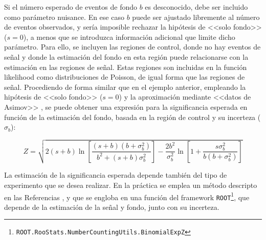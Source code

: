 Si el número esperado de eventos de fondo $b$ es desconocido, debe ser incluido como parámetro nuisance. En ese caso $b$ puede ser ajustado libremente al número de eventos observados, y sería imposible rechazar la hipótesis de <<solo fondo>> ($s=0$), a menos que se introduzca información adicional que limite dicho parámetro. Para ello, se incluyen las regiones de control, donde no hay eventos de señal y donde la estimación del fondo en esta región puede relacionarse con la estimación en las regiones de señal. Estas regiones son incluidas en la función likelihood como distribuciones de Poisson, de igual forma que las regiones de señal. Procediendo de forma similar que en el ejemplo anterior, empleando la hipótesis de <<solo fondo>> ($s=0$) y la aproximación mediante <<datos de Asimov>> \cite{Cowan:2010js}, se puede obtener una expresión para la significancia esperada en función de la estimación del fondo, basada en la región de control y su incerteza ($\sigma_b$):

\begin{equation}
	Z = \sqrt{ 2 (s+b) \ln{\left[ \frac{(s+b)(b+\sigma_b^2)}{b^2 + (s+b)\sigma_b^2} \right]} - \frac{2 b^2}{\sigma_b^2} \ln{ \left[ 1 + \frac{s \sigma_b^2}{b(b+\sigma_b^2)} \right] } }
\end{equation}

La estimación de la significancia esperada depende también del tipo de experimento que se desea realizar. En la práctica se emplea un método descripto en las Referencias \cite{Linnemann:2003vw, stat_1, ATL-PHYS-PUB-2020-025}, y que se engloba en una función del framework \texttt{ROOT}\footnote{\texttt{ROOT.RooStats.NumberCountingUtils.BinomialExpZ}}, que depende de la estimación de la señal y fondo, junto con su incerteza. 

